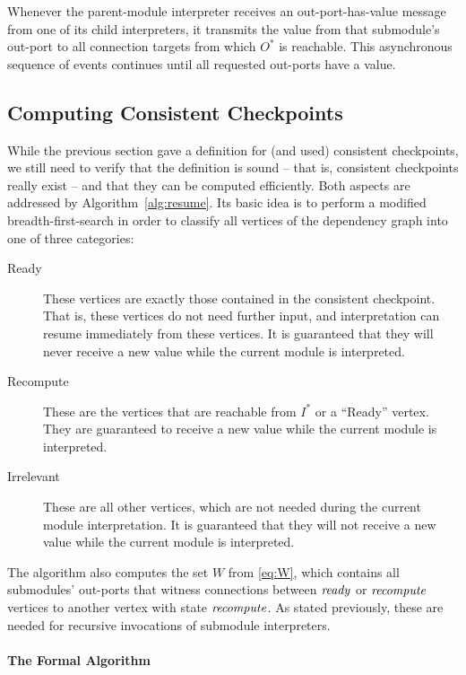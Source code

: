 \documentclass[paper=letter,fontsize=11pt,captions=tableheading]{scrartcl}
\numberwithin{equation}{section}
\theoremstyle{algorithm}
\theoremstyle{plain}
\theoremstyle{nonumberplain}
\begin{document}
Whenever the parent-module interpreter receives an out-port-has-value message from one of its child interpreters, it transmits the value from that submodule's out-port to all connection targets from which $O^*$ is reachable. This asynchronous sequence of events continues until all requested out-ports have a value.

\subsection{Computing Consistent Checkpoints} \label{sec:computecp}

While the previous section gave a definition for (and used) consistent checkpoints, we still need to verify that the definition is sound -- that is, consistent checkpoints really exist -- and that they can be computed efficiently. Both aspects are addressed by Algorithm~\ref{alg:resume}. Its basic idea is to perform a modified breadth-first-search in order to classify all vertices of the dependency graph into one of three categories:
%
\begin{description}
	\item[Ready] These vertices are exactly those contained in the consistent checkpoint. That is, these vertices do not need further input, and interpretation can resume immediately from these vertices. It is guaranteed that they will never receive a new value while the current module is interpreted.
	\item[Recompute] These are the vertices that are reachable from $I^*$ or a ``Ready'' vertex. They are guaranteed to receive a new value while the current module is interpreted.
	\item[Irrelevant] These are all other vertices, which are not needed during the current module interpretation. It is guaranteed that they will not receive a new value while the current module is interpreted.
\end{description}
%
The algorithm also computes the set $W$ from \eqref{eq:W}, which contains all submodules' out-ports that witness connections between $\mathit{ready}$ or $\mathit{recompute}$ vertices to another vertex with state $\mathit{recompute}$. As stated previously, these are needed for recursive invocations of submodule interpreters.

\paragraph{The Formal Algorithm}
\end{document}
